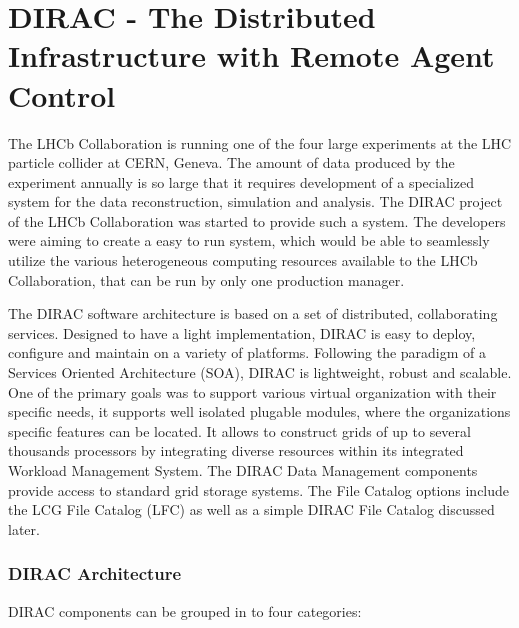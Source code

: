 \chapter{DIRAC - The Distributed Infrastructure with Remote Agent Control}
\label{chap:DIRAC}

The LHCb Collaboration \cite{LHCb} is running one of the four large experiments at the LHC particle 
collider at CERN, Geneva. The amount of data produced by the experiment
annually is so large that it requires development of a specialized system for the data reconstruction, simulation 
and analysis. The DIRAC project of the LHCb Collaboration was started to
provide such a system.\cite{Dir2} The developers were aiming to create a easy to run system, which would be able 
to seamlessly utilize the various heterogeneous computing resources available to the LHCb Collaboration, 
that can be run by only one production manager. 

The DIRAC software architecture is based on a set of distributed, collaborating services. Designed to have a
light implementation, DIRAC is easy to deploy, configure and maintain on a variety of platforms. Following
the paradigm of a Services Oriented Architecture (SOA)\cite{SOA}, DIRAC is lightweight, robust and scalable. 
One of the primary goals was to support various virtual organization with their specific needs, it supports well 
isolated plugable modules, where the organizations specific features can be located. It allows to construct
grids of up to several thousands processors by integrating diverse resources within its integrated Workload
Management System. The DIRAC Data Management components provide access to standard grid storage systems. 
The File Catalog options include the LCG File Catalog (LFC) as well as a simple DIRAC File Catalog discussed later. 

\subsection{DIRAC Architecture}
DIRAC components can be grouped in to four categories: 

